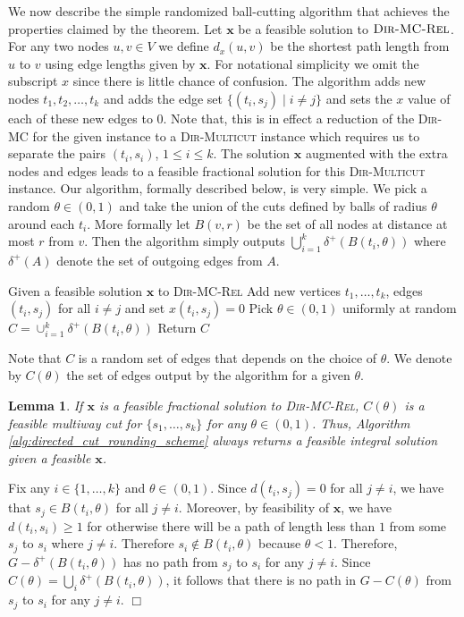 \documentclass[11pt]{article}
\newtheorem{lemma}{Lemma}[section]
\renewenvironment{proof}{\vspace{-0.1in}\noindent{\bf Proof:}}{\hspace*{\fill}$\Box$\par}
\def\bx{\textbf{x}}
\def\DirMC{\textsc{Dir-MC}\xspace}
\def\DirMCRel{\textsc{Dir-MC-Rel}\xspace}
\def\DirMulticut{\textsc{Dir-Multicut}\xspace}
\begin{document}
We now describe the simple randomized ball-cutting algorithm that
achieves the properties claimed by the theorem. Let $\bx$ be a
feasible solution to $\DirMCRel$. For any two nodes $u,v \in V$ we
define $d_x(u,v)$ be the shortest path length from $u$ to $v$ using
edge lengths given by $\bx$. For notational simplicity we omit the
subscript $x$ since there is little chance of confusion. The algorithm
adds new nodes $t_1,t_2,\ldots,t_k$ and adds the edge set $\{(t_i,s_j)
\mid i \neq j\}$ and sets the $x$ value of each of these new edges to
$0$. Note that, this is in effect a reduction of the \DirMC for the
given instance to a \DirMulticut instance which requires us to
separate the pairs $(t_i,s_i)$, $1 \le i \le k$. The solution $\bx$
augmented with the extra nodes and edges leads to a feasible
fractional solution for this \DirMulticut instance. Our algorithm,
formally described below, is very simple. We pick a random $\theta \in
(0,1)$ and take the union of the cuts defined by balls of radius
$\theta$ around each $t_i$. More formally let $B(v,r)$ be the set of
all nodes at distance at most $r$ from $v$.  Then the algorithm simply
outputs $\bigcup_{i=1}^k \delta^+(B(t_i,\theta))$ where $\delta^+(A)$
denote the set of outgoing edges from $A$.

\begin{algorithm}
	\caption{Rounding for \DirMC}
	\label{alg:directed_cut_rounding_scheme}
	\begin{algorithmic}[1]
		\STATE Given a feasible solution $\bx$
                to \DirMCRel
		\STATE Add new vertices $t_1,\dots,t_k$, edges $(t_i,s_j)$ 
              for all $i \neq j$ and set $x(t_i,s_j) = 0$ 
		\STATE Pick $\theta \in (0,1)$ uniformly at random
\STATE $C = \cup_{i=1}^k \delta^+(B(t_i,\theta))$
		\STATE Return $C$
	\end{algorithmic}
\end{algorithm}

Note that $C$ is a random set of edges that depends on the choice of
$\theta$. We denote by $C(\theta)$ the set of edges output by the
algorithm for a given $\theta$.

\begin{lemma}
  \label{lem:dir-feasibility}
  If $\bx$ is a feasible fractional solution to \DirMCRel, $C(\theta)$
  is a feasible multiway cut for $\{s_1,\ldots,s_k\}$ for any $\theta
  \in (0,1)$. Thus, Algorithm \ref{alg:directed_cut_rounding_scheme}
  always returns a feasible integral solution given a feasible $\bx$.
\end{lemma}
\begin{proof}
  Fix any $i \in \{1,\ldots, k\}$ and $\theta \in (0,1)$. Since
  $d(t_i,s_j) = 0$ for all $j \neq i$, we have that $s_j \in
  B(t_i,\theta)$ for all $j \neq i$. Moreover, by feasibility of
  $\bx$, we have $d(t_i,s_i) \ge 1$ for otherwise there will be a path
  of length less than $1$ from some $s_j$ to $s_i$ where $j \neq i$.
  Therefore $s_i \not \in B(t_i,\theta)$ because $\theta < 1$.
  Therefore, $G - \delta^+(B(t_i,\theta))$ has no path from $s_j$ to
  $s_i$ for any $j \neq i$. Since $C(\theta) = \bigcup_i
  \delta^+(B(t_i,\theta))$, it follows that there is no path in $G -
  C(\theta)$ from $s_j$ to $s_i$ for any $j \neq i$.
\end{proof}
\end{document}
